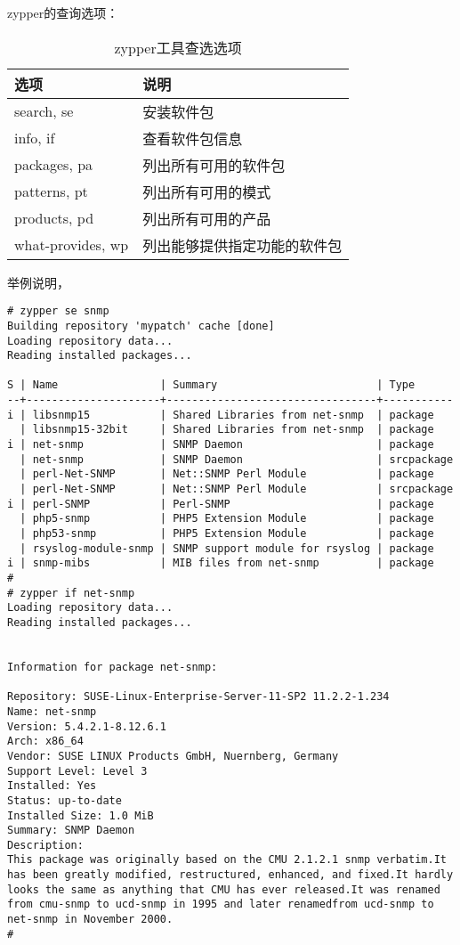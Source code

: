 zypper的查询选项：

\begin{table}[!htbp]
  \centering
    \caption{zypper工具查选选项}
    \begin{tabular}{ll}
      \toprule
      选项              & 说明 \\
      \midrule
      search, se        & 安装软件包 \\
      info, if          & 查看软件包信息 \\
      packages, pa      & 列出所有可用的软件包 \\
      patterns, pt      & 列出所有可用的模式 \\
      products, pd      & 列出所有可用的产品 \\
      what-provides, wp & 列出能够提供指定功能的软件包 \\
      \bottomrule
    \end{tabular}
\end{table}

举例说明，

\begin{verbatim}
# zypper se snmp
Building repository 'mypatch' cache [done]
Loading repository data...
Reading installed packages...

S | Name                | Summary                         | Type      
--+---------------------+---------------------------------+-----------
i | libsnmp15           | Shared Libraries from net-snmp  | package   
  | libsnmp15-32bit     | Shared Libraries from net-snmp  | package   
i | net-snmp            | SNMP Daemon                     | package   
  | net-snmp            | SNMP Daemon                     | srcpackage
  | perl-Net-SNMP       | Net::SNMP Perl Module           | package   
  | perl-Net-SNMP       | Net::SNMP Perl Module           | srcpackage
i | perl-SNMP           | Perl-SNMP                       | package   
  | php5-snmp           | PHP5 Extension Module           | package   
  | php53-snmp          | PHP5 Extension Module           | package   
  | rsyslog-module-snmp | SNMP support module for rsyslog | package   
i | snmp-mibs           | MIB files from net-snmp         | package
#
# zypper if net-snmp
Loading repository data...
Reading installed packages...


Information for package net-snmp:

Repository: SUSE-Linux-Enterprise-Server-11-SP2 11.2.2-1.234
Name: net-snmp
Version: 5.4.2.1-8.12.6.1
Arch: x86_64
Vendor: SUSE LINUX Products GmbH, Nuernberg, Germany
Support Level: Level 3
Installed: Yes
Status: up-to-date
Installed Size: 1.0 MiB
Summary: SNMP Daemon
Description: 
This package was originally based on the CMU 2.1.2.1 snmp verbatim.It has been greatly modified, restructured, enhanced, and fixed.It hardly looks the same as anything that CMU has ever released.It was renamed from cmu-snmp to ucd-snmp in 1995 and later renamedfrom ucd-snmp to net-snmp in November 2000.
#
\end{verbatim}

